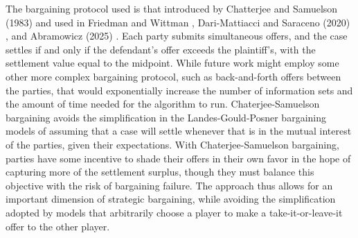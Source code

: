 \documentclass{article}
\begin{document}
The bargaining protocol used is that introduced by Chatterjee and Samuelson (1983) \cite{chatterjeesamuelson} and used in Friedman and Wittman \cite{friedmanwittman}, Dari-Mattiacci and Saraceno (2020) \cite{darimatiaccisaraceno}, and Abramowicz (2025) \cite{abramowicz}. Each party submits simultaneous offers, and the case settles if and only if the defendant's offer exceeds the plaintiff's, with the settlement value equal to the midpoint. While future work might employ some other more complex bargaining protocol, such as back-and-forth offers between the parties, that would exponentially increase the number of information sets and the amount of time needed for the algorithm to run. Chaterjee-Samuelson bargaining avoids the simplification in the Landes-Gould-Posner bargaining models of assuming that a case will settle whenever that is in the mutual interest of the parties, given their expectations. With Chaterjee-Samuelson bargaining, parties have some incentive to shade their offers in their own favor in the hope of capturing more of the settlement surplus, though they must balance this objective with the risk of bargaining failure. The approach thus allows for an important dimension of strategic bargaining, while avoiding the simplification adopted by models that arbitrarily choose a player to make a take-it-or-leave-it offer to the other player.
\end{document}
